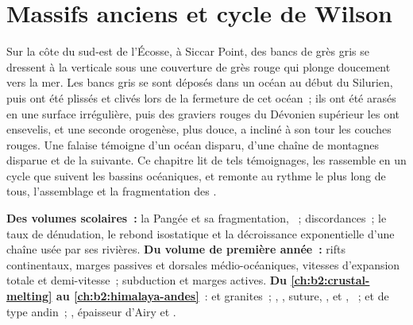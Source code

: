 \chapter{Massifs anciens et cycle de Wilson}\label{ch:b2:wilson-cycle}

Sur la côte du sud-est de l'Écosse, à Siccar Point, des bancs de grès gris se dressent à la verticale
sous une couverture de grès rouge qui plonge doucement vers la mer. Les bancs gris se sont déposés
dans un océan au début du Silurien, puis ont été plissés et clivés lors de la fermeture de cet océan~;
ils ont été arasés en une surface irrégulière, puis des graviers rouges du Dévonien supérieur les ont
ensevelis, et une seconde orogenèse, plus douce, a incliné à son tour les couches rouges. Une falaise
témoigne d'un océan disparu, d'une chaîne de montagnes disparue et de la suivante. Ce chapitre lit de
tels témoignages, les rassemble en un cycle que suivent les bassins océaniques, et remonte au rythme
le plus long de tous, l'assemblage et la fragmentation des .

\begin{recall}
\textbf{Des volumes scolaires~:} la Pangée et sa fragmentation, ~; discordances~;
le taux de dénudation, le rebond isostatique et la décroissance exponentielle d'une chaîne usée
par ses rivières. \textbf{Du volume de première année~:} rifts continentaux, marges passives et
dorsales médio-océaniques, vitesses d'expansion totale et demi-vitesse~; subduction et marges actives.
\textbf{Du \cref{ch:b2:crustal-melting} au \cref{ch:b2:himalaya-andes}}~:  et
granites~; , , suture, ,  et , ~;
 et de type andin~; , épaisseur d'Airy et .
\end{recall}

